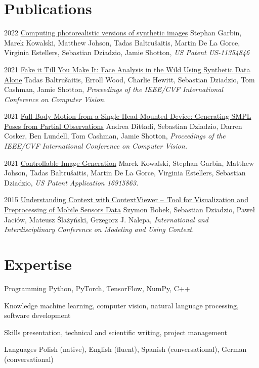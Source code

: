 \documentclass[]{friggeri-cv_osx}
\begin{document}
\section{Publications}
\begin{entrylist}
\entry
{2022}
{\href{https://scholar.google.com/citations?user=8vAIQXoAAAAJ&hl=en}{Computing photorealistic versions of synthetic images}}
{}
{Stephan Garbin, Marek Kowalski, Matthew Johson, Tadas Baltru\v{s}aitis, Martin De La Gorce, Virginia Estellers, Sebastian Dziadzio, Jamie Shotton,
\textit{US Patent US-11354846}\\}

\entry
{2021}
{\href{https://scholar.google.com/citations?user=8vAIQXoAAAAJ&hl=en}{Fake it Till You Make It: Face Analysis in the Wild Using Synthetic Data Alone}}
{}
{Tadas Baltru\v{s}aitis, Erroll Wood, Charlie Hewitt, Sebastian Dziadzio, Tom Cashman, Jamie Shotton,
\textit{Proceedings of the IEEE/CVF International Conference on Computer Vision.}\\}

\entry
{2021}
{\href{https://scholar.google.com/citations?user=8vAIQXoAAAAJ&hl=en}{Full-Body Motion from a Single Head-Mounted Device: Generating SMPL Poses from Partial Observations}}
{}
{Andrea Dittadi, Sebastian Dziadzio, Darren Cosker, Ben Lundell, Tom Cashman, Jamie Shotton,
\textit{Proceedings of the IEEE/CVF International Conference on Computer Vision.}\\}

\entry
{2021}
{\href{https://scholar.google.com/citations?user=8vAIQXoAAAAJ&hl=en}{Controllable Image Generation}}
{}
{Marek Kowalski, Stephan Garbin, Matthew Johson, Tadas Baltru\v{s}aitis, Martin De La Gorce, Virginia Estellers, Sebastian Dziadzio,
\textit{US Patent Application 16915863.}\\}

\entry
{2015}
{\href{https://scholar.google.com/citations?user=8vAIQXoAAAAJ&hl=en}{Understanding Context with ContextViewer – Tool for Visualization and Preprocessing of Mobile Sensors Data}}
{}
{Szymon Bobek, Sebastian Dziadzio, Paweł Jaciów, Mateusz Ślażyński, Grzegorz J. Nalepa,
\textit{International and Interdisciplinary Conference on Modeling and Using Context.}\\}
\end{entrylist}

\section{Expertise}
\begin{entrylist}
\entry
{}
{Programming}
{}
{Python, PyTorch, TensorFlow, NumPy, C++}

\entry
{}
{Knowledge}
{}
{machine learning, computer vision, natural language processing, software development}

\entry
{}
{Skills}
{}
{presentation, technical and scientific writing, project management}

\entry
{}
{Languages}
{}
{Polish (native), English (fluent), Spanish (conversational), German (conversational)}
\end{entrylist}
\end{document}
